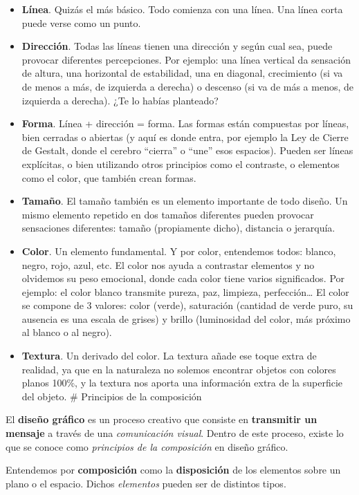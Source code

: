\documentclass[
  16pt,
]{krantz}
\theoremstyle{definition}
\theoremstyle{definition}
\theoremstyle{definition}
\theoremstyle{definition}
\theoremstyle{remark}
\begin{document}
\begin{itemize}
\item
  \textbf{Línea}. Quizás el más básico. Todo comienza con una línea. Una línea corta puede verse como un punto.
\item
  \textbf{Dirección}. Todas las líneas tienen una dirección y según cual sea, puede provocar diferentes percepciones. Por ejemplo: una línea vertical da sensación de altura, una horizontal de estabilidad, una en diagonal, crecimiento (si va de menos a más, de izquierda a derecha) o descenso (si va de más a menos, de izquierda a derecha). ¿Te lo habías planteado?
\item
  \textbf{Forma}. Línea + dirección = forma. Las formas están compuestas por líneas, bien cerradas o abiertas (y aquí es donde entra, por ejemplo la Ley de Cierre de Gestalt, donde el cerebro ``cierra'' o ``une'' esos espacios). Pueden ser líneas explícitas, o bien utilizando otros principios como el contraste, o elementos como el color, que también crean formas.
\item
  \textbf{Tamaño}. El tamaño también es un elemento importante de todo diseño. Un mismo elemento repetido en dos tamaños diferentes pueden provocar sensaciones diferentes: tamaño (propiamente dicho), distancia o jerarquía.
\item
  \textbf{Color}. Un elemento fundamental. Y por color, entendemos todos: blanco, negro, rojo, azul, etc. El color nos ayuda a contrastar elementos y no olvidemos su peso emocional, donde cada color tiene varios significados. Por ejemplo: el color blanco transmite pureza, paz, limpieza, perfección\ldots{} El color se compone de 3 valores: color (verde), saturación (cantidad de verde puro, su ausencia es una escala de grises) y brillo (luminosidad del color, más próximo al blanco o al negro).
\item
  \textbf{Textura}. Un derivado del color. La textura añade ese toque extra de realidad, ya que en la naturaleza no solemos encontrar objetos con colores planos 100\%, y la textura nos aporta una información extra de la superficie del objeto. \# Principios de la composición
\end{itemize}

El \textbf{diseño gráfico} es un proceso creativo que consiste en \textbf{transmitir un mensaje} a través de una \emph{comunicación visual}. Dentro de este proceso, existe lo que se conoce como \emph{principios de la composición} en diseño gráfico.

Entendemos por \textbf{composición} como la \textbf{disposición} de los elementos sobre un plano o el espacio. Dichos \emph{elementos} pueden ser de distintos tipos.
\end{document}

